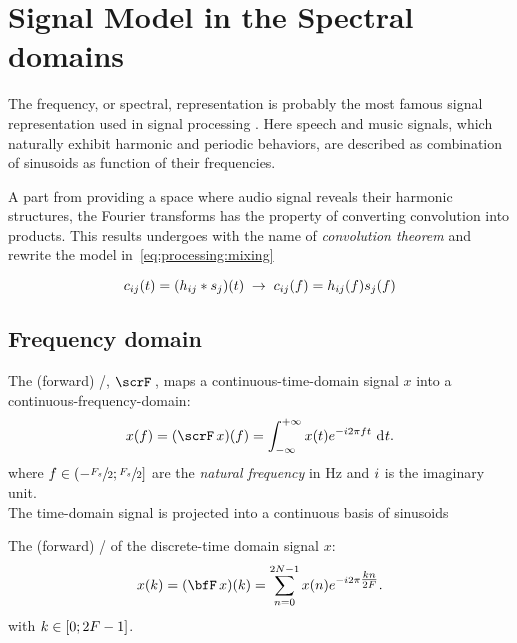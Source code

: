 \section{Signal Model in the Spectral domains}\label{sec:processing:domains}
The frequency, or spectral, representation is probably the most famous signal representation used in signal processing
.
Here speech and music signals, which naturally exhibit harmonic and periodic behaviors,
are described as combination of sinusoids as function of their frequencies.

A part from providing a space where audio signal reveals their harmonic structures, the Fourier transforms has the property of converting convolution into products.
This results undergoes with the name of \textit{convolution theorem} and rewrite the model in~\cref{eq:processing:mixing}

\begin{equation}
    \img_{\idxMic\idxSrc}( t) =  \kparen{h_{\idxMic\idxSrc} \conv \src_\idxSrc} ( t)
    \;\rightarrow\;
    \img_{\idxMic\idxSrc}( f) =  h_{\idxMic\idxSrc}( f) \src_\idxSrc( f)
\end{equation}


\subsection{Frequency domain}
The (forward) \FTdef/, $\fourierTrans{}$, maps a continuous-time-domain signal $x$ into a continuous-frequency-domain:
\begin{equation}
    x(f) = (\fourierTrans{x})(f) =
        \int_{-\infty}^{+\infty}
        x(t)
        \cste^{-\csti 2 \pi f t}
        \,\kdiff{t}.
\end{equation}
where $f \in \kintervoc{-\sfrac{\Fs}{2}}{\sfrac{\Fs}{2}}$ are the \textit{natural frequency} in $\si{\Hz}$ and ${i}$ is the imaginary unit.
\\The time-domain signal is projected into a continuous basis of sinusoids

The (forward) \DFTdef/ of the discrete-time domain signal $x$:
\begin{equation}\label{eq:processing:dft}
    x(k) = (\discreteFT{x})(k) =
    \sum_{n = 0}^{2 N - 1}
    x(n)
    \cste^{-\csti2\pi \tfrac{k n}{2 F}}.
\end{equation}
with $k \in \kintervcc{0}{2 F - 1}$.

